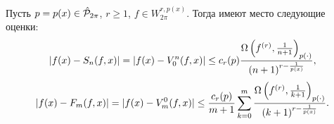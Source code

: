 \begin{corollary}\label{4}
Пусть  $p=p(x)\in \hat{\cal  P}_{2\pi}$, $r\ge1$, $f\in W^{r,p(x)}_{2\pi}$. Тогда имеют место следующие оценки:
$$
|f(x)-S_n(f,x)|= |f(x)-V_0^n(f,x)|\le c_r(p){\Omega\left(f^{(r)},\frac1{n+1}\right)_{p(\cdot)}\over (n+1)^{r-{\frac{1}{p(x)}}}},
$$
$$
 |f(x)-F_m(f,x)| =   |f(x)-V_m^0(f,x)|\le \frac{c_r(p)}{m+1}\sum_{k=0}^{m}{\Omega\left(f^{(r)},\frac1{k+1}\right)_{p(\cdot)}\over (k+1)^{r-{\frac{1}{p(x)}}}} .
$$
 \end{corollary}











